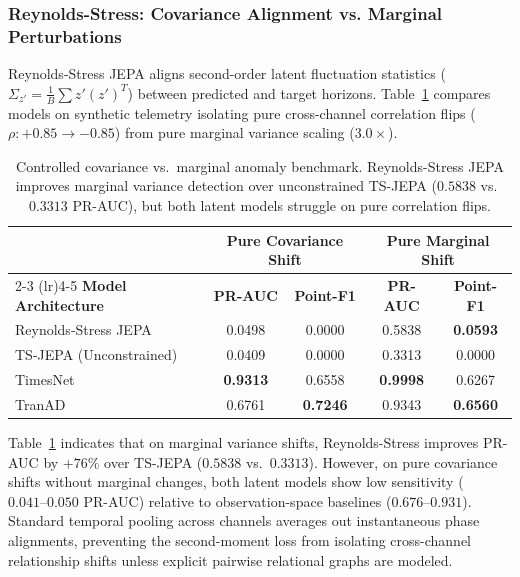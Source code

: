 \subsubsection{Reynolds-Stress: Covariance Alignment vs. Marginal Perturbations}
Reynolds-Stress JEPA aligns second-order latent fluctuation statistics ($\Sigma_{z'} = \frac{1}{B} \sum z' (z')^T$) between predicted and target horizons. Table~\ref{tab:covariance_validation} compares models on synthetic telemetry isolating pure cross-channel correlation flips ($\rho: +0.85 \to -0.85$) from pure marginal variance scaling ($3.0\times$).

\begin{table}[t]
\centering
\small
\caption{Controlled covariance vs.\ marginal anomaly benchmark. Reynolds-Stress JEPA improves marginal variance detection over unconstrained TS-JEPA ($0.5838$ vs.\ $0.3313$ PR-AUC), but both latent models struggle on pure correlation flips.}
\label{tab:covariance_validation}
\scriptsize
\setlength{\tabcolsep}{2.5pt}
\begin{tabular}{@{}lcccc@{}}
\toprule
& \multicolumn{2}{c}{\textbf{Pure Covariance Shift}} & \multicolumn{2}{c}{\textbf{Pure Marginal Shift}} \\
\cmidrule(lr){2-3} \cmidrule(lr){4-5}
\textbf{Model Architecture} & \textbf{PR-AUC} & \textbf{Point-F1} & \textbf{PR-AUC} & \textbf{Point-F1} \\
\midrule
Reynolds-Stress JEPA & 0.0498 & 0.0000 & 0.5838 & \textbf{0.0593} \\
TS-JEPA (Unconstrained) & 0.0409 & 0.0000 & 0.3313 & 0.0000 \\
TimesNet & \textbf{0.9313} & 0.6558 & \textbf{0.9998} & 0.6267 \\
TranAD & 0.6761 & \textbf{0.7246} & 0.9343 & \textbf{0.6560} \\
\bottomrule
\end{tabular}
\end{table}

Table~\ref{tab:covariance_validation} indicates that on marginal variance shifts, Reynolds-Stress improves PR-AUC by $+76\%$ over TS-JEPA ($0.5838$ vs.\ $0.3313$). However, on pure covariance shifts without marginal changes, both latent models show low sensitivity ($0.041\text{--}0.050$ PR-AUC) relative to observation-space baselines ($0.676\text{--}0.931$). Standard temporal pooling across channels averages out instantaneous phase alignments, preventing the second-moment loss from isolating cross-channel relationship shifts unless explicit pairwise relational graphs are modeled.

